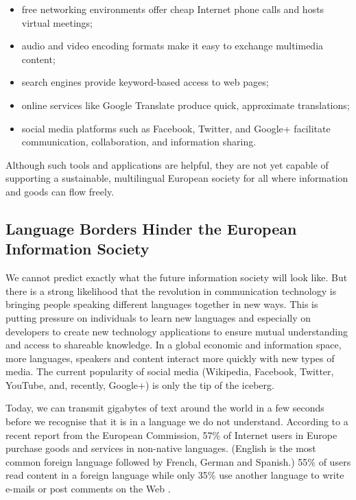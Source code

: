 \begin{multicols}{2}
\begin{itemize}
\item free networking environments offer cheap Internet phone calls and hosts virtual
meetings;

\item audio and video encoding formats make it easy to exchange multimedia content;

\item search engines provide keyword-based access to web pages;

\item online services like Google Translate produce quick, approximate translations;

\item social media platforms such as Facebook, Twitter, and Google+ facilitate
communication, collaboration, and information sharing.
\end{itemize}

Although such tools and applications are helpful, they are not yet capable of supporting a sustainable, multilingual European society for all where information and goods can flow freely.

\subsection{Language Borders Hinder the European Information Society}

We cannot predict exactly what the future information society will look like.  But there is a strong likelihood that the revolution in communication technology is bringing people speaking different languages together in new ways. This is putting pressure on individuals to learn new languages and especially on developers to create new technology applications to ensure mutual understanding and access to shareable knowledge. In a global economic and information space, more languages, speakers and content interact more quickly with new types of media. The current popularity of social media (Wikipedia, Facebook, Twitter, YouTube, and, recently, Google+) is only the tip of the iceberg.

Today, we can transmit gigabytes of text around the world in a few seconds before we recognise that it is in a language we do not understand. According to a recent report from the European Commission, 57\% of Internet users in Europe purchase goods and services in non-native languages. (English is the most common foreign language followed by French, German and Spanish.) 55\% of users read content in a foreign language while only 35\% use another language to write e-mails or post comments on the Web \cite{EC-prefer}.


\end{multicols}
